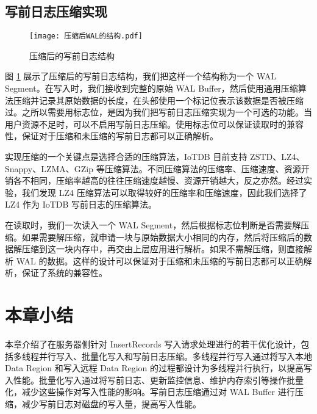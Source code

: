 \subsection{写前日志压缩实现}
\begin{figure}
  \centering
  \texttt{[image: 压缩后WAL的结构.pdf]}
  \caption{压缩后的写前日志结构}
  \label{fig:compressed-wal-structure}
\end{figure}
图 \ref{fig:compressed-wal-structure} 展示了压缩后的写前日志结构，我们把这样一个结构称为一个 WAL Segment。在写入时，我们接收到完整的原始 WAL Buffer，然后使用通用压缩算法压缩并记录其原始数据的长度，在头部使用一个标记位表示该数据是否被压缩过。之所以需要用标志位，是因为我们把写前日志压缩实现为一个可选的功能。当用户资源不足时，可以不启用写前日志压缩。使用标志位可以保证读取时的兼容性，保证对于压缩和未压缩的写前日志都可以正确解析。

实现压缩的一个关键点是选择合适的压缩算法，IoTDB 目前支持 ZSTD、LZ4、Snappy、LZMA、GZip 等压缩算法。不同压缩算法的压缩率、压缩速度、资源开销各不相同，压缩率越高的往往压缩速度越慢、资源开销越大，反之亦然。经过实验，我们发现 LZ4 压缩算法可以取得较好的压缩率和压缩速度，因此我们选择了 LZ4 作为 IoTDB 写前日志的压缩算法。

在读取时，我们一次读入一个 WAL Segment，然后根据标志位判断是否需要解压缩。如果需要解压缩，就申请一块与原始数据大小相同的内存，然后将压缩后的数据解压缩到这一块内存中，再交由上层应用进行解析。如果不需解压缩，则直接解析 WAL 的数据。这样的设计可以保证对于压缩和未压缩的写前日志都可以正确解析，保证了系统的兼容性。
\section{本章小结}
本章介绍了在服务器侧针对 InsertRecords 写入请求处理进行的若干优化设计，包括多线程并行写入、批量化写入和写前日志压缩。多线程并行写入通过将写入本地 Data Region 和写入远程 Data Region 的过程都设计为多线程并行执行，以提高写入性能。批量化写入通过将写前日志、更新监控信息、维护内存索引等操作批量化，减少这些操作对写入性能的影响。写前日志压缩通过对 WAL Buffer 进行压缩，减少写前日志对磁盘的写入量，提高写入性能。